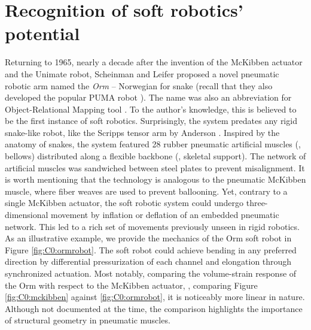 \section{Recognition of soft robotics' potential} Returning to 1965, nearly a decade after the invention of the McKibben actuator and the Unimate robot, Scheinman and Leifer proposed a novel pneumatic robotic arm named the \emph{Orm} -- Norwegian for snake (recall that they also developed the popular PUMA robot \cite{BibEntryPuma2022Sep}). The name was also an abbreviation for Object-Relational Mapping tool \cite{Corke2020}. To the author's knowledge, this is believed to be the first instance of soft robotics. Surprisingly, the system predates any rigid snake-like robot, like the Scripps tensor arm by Anderson \cite{Anderson1968}. Inspired by the anatomy of snakes, the system featured 28 rubber pneumatic artificial muscles (\ie, bellows) distributed along a flexible backbone (\ie, skeletal support). The network of artificial muscles was sandwiched between steel plates to prevent misalignment. It is worth mentioning that the technology is analogous to the pneumatic McKibben muscle, where fiber weaves are used to prevent ballooning. Yet, contrary to a single McKibben actuator, the soft robotic system could undergo three-dimensional movement by inflation or deflation of an embedded pneumatic network. This led to a rich set of movements previously unseen in rigid robotics. As an illustrative example, we provide the mechanics of the Orm soft robot in Figure \ref{fig:C0:ormrobot}. The soft robot could achieve bending in any preferred direction by differential pressurization of each channel and elongation through synchronized actuation. Most notably, comparing the volume-strain response of the Orm with respect to the McKibben actuator, \ie, comparing Figure \ref{fig:C0:mckibben} against \ref{fig:C0:ormrobot}, it is noticeably more linear in nature. Although not documented at the time, the comparison highlights the importance of structural geometry in pneumatic muscles.

